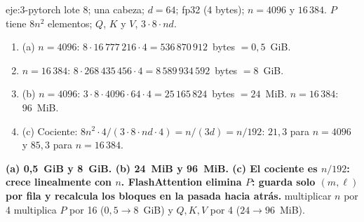 \begin{solucion}{eje:3-pytorch}
\datos lote 8; una cabeza; $d=64$; fp32 (4 bytes); $n=4096$ y $16\,384$.
\planteamiento $P$ tiene $8n^{2}$ elementos; $Q$, $K$ y $V$, $3\cdot 8\cdot nd$.
\pasos
\begin{enumerate}[label=\arabic*.]
  \item (a) $n=4096$: $8\cdot 16\,777\,216\cdot 4=536\,870\,912$~bytes $=0{,}5$~GiB.
  \item $n=16\,384$: $8\cdot 268\,435\,456\cdot 4=8\,589\,934\,592$~bytes $=8$~GiB.
  \item (b) $n=4096$: $3\cdot 8\cdot 4096\cdot 64\cdot 4=25\,165\,824$~bytes $=24$~MiB. $n=16\,384$: 96~MiB.
  \item (c) Cociente: $8n^{2}\cdot 4/(3\cdot 8\cdot nd\cdot 4)=n/(3d)=n/192$: $21{,}3$ para $n=4096$ y $85{,}3$ para $n=16\,384$.
\end{enumerate}
\resultado \textbf{(a) 0{,}5~GiB y 8~GiB. (b) 24~MiB y 96~MiB. (c) El cociente es $n/192$: crece linealmente con $n$. FlashAttention elimina $P$: guarda solo $(m,\ell)$ por fila y recalcula los bloques en la pasada hacia atrás.}
\comprobacion multiplicar $n$ por 4 multiplica $P$ por 16 ($0{,}5\to 8$~GiB) y $Q,K,V$ por 4 ($24\to 96$~MiB).
\end{solucion}

